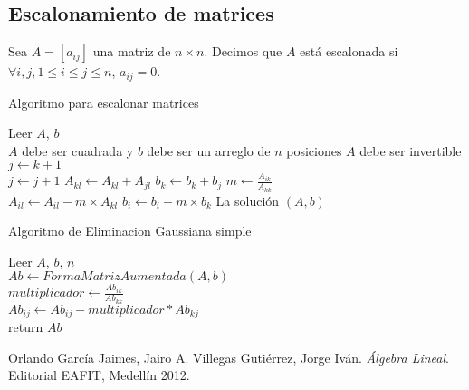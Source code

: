 \documentclass[12pt]{article}
\begin{document}
	\subsection{Escalonamiento de matrices}
	\begin{definition}
		Sea $A = [a_{ij}]$ una matriz de $n \times n$. Decimos que $A$ está escalonada si $\forall{i,j}, 1\leq i \leq j \leq n$, $a_{ij} = 0$.
    \end{definition}
    
	\begin{algorithm}[H]
		\caption{Algoritmo para escalonar matrices}
		Leer $A$, $b$ \\
		{$A$ debe ser cuadrada y $b$ debe ser un arreglo de $n$ posiciones}
		{$A$ debe ser invertible}
		\Else 
		{
			{ 
				{
					$j \leftarrow k + 1$\\
					{
						$j \leftarrow j + 1$
					}
					{
						{
							$A_{kl} \leftarrow A_{kl} + A_{jl}$
						}
						$b_k \leftarrow b_k + b_j$
					}
				}
				{
					{
						$m \leftarrow \frac{A_{ik}}{A_{kk}}$\\
						{
							$A_{il} \leftarrow A_{il} - m\times A_{kl}$
						}
						$b_i \leftarrow b_i - m \times b_k$
					}
				}
			}
		}
		La solución $(A, b)$
    \end{algorithm}

    \begin{algorithm}[H]
		\caption{Algoritmo de Eliminacion Gaussiana simple}
        Leer $A$, $b$, $n$ \\
        $Ab \leftarrow FormaMatrizAumentada(A, b)$\\
        {
            {
                $multiplicador \leftarrow \frac{Ab_{ik}} {Ab_{kk}}$\\
                {
                    $Ab_{ij} \leftarrow Ab_{ij} - multiplicador * Ab_{kj}$\\
                }
            }
        }
        return $Ab$\\
    \end{algorithm}
    
	\begin{thebibliography}{9}
		Orlando García Jaimes, Jairo A. Villegas Gutiérrez, Jorge Iván. \textit{Álgebra Lineal}. Editorial EAFIT, Medellín 2012. 
	\end{thebibliography}
\end{document}

